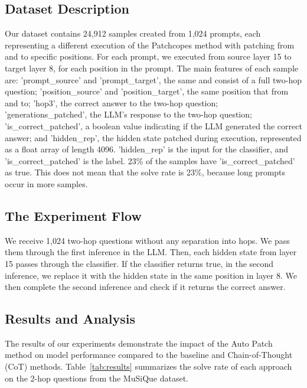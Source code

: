 \documentclass[11pt]{article}
\begin{document}
\subsection{Dataset Description}
Our dataset contains 24,912 samples created from 1,024 prompts, each representing a different execution of the Patchcopes method with patching from and to specific positions. For each prompt, we executed from source layer 15 to target layer 8, for each position in the prompt. The main features of each sample are: 'prompt\_source' and 'prompt\_target', the same and consist of a full two-hop question; 'position\_source' and 'position\_target', the same position that from and to; 'hop3', the correct answer to the two-hop question; 'generations\_patched', the LLM's response to the two-hop question; 'is\_correct\_patched', a boolean value indicating if the LLM generated the correct answer; and 'hidden\_rep', the hidden state patched during execution, represented as a float array of length 4096. 'hidden\_rep' is the input for the classifier, and 'is\_correct\_patched' is the label.
23\% of the samples have 'is\_correct\_patched' as true. This does not mean that the solve rate is 23\%, because long prompts occur in more samples.


\subsection{The Experiment Flow}
We receive 1,024 two-hop questions without any separation into hops. We pass them through the first inference in the LLM. Then, each hidden state from layer 15 passes through the classifier. If the classifier returns true, in the second inference, we replace it with the hidden state in the same position in layer 8. We then complete the second inference and check if it returns the correct answer.


\subsection{Results and Analysis}

The results of our experiments demonstrate the impact of the Auto Patch method on model performance compared to the baseline and Chain-of-Thought (CoT) methods. Table~\ref{tab:results} summarizes the solve rate of each approach on the 2-hop questions from the MuSiQue dataset.

\begin{table}[h!]
    \centering
    \caption{Comparison of solve rate on MuSiQue 2-hop questions.}
    \label{tab:results}
\end{table}
\end{document}
